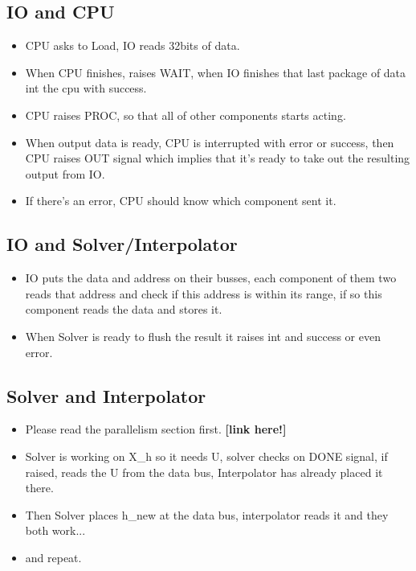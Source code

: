\documentclass[12pt]{report}
\begin{document}
\subsection{IO and CPU}
\begin{itemize}
    \item CPU asks to Load, IO reads 32bits of data.
    \item When CPU finishes, raises WAIT, when IO finishes that last package of data int the cpu with success.
    \item CPU raises PROC, so that all of other components starts acting.
    \item When output data is ready, CPU is interrupted with error or success, then CPU raises OUT signal which implies that it's ready to take out the resulting output from IO.
    \item If there's an error, CPU should know which component sent it.
\end{itemize}

\subsection{IO and Solver/Interpolator}
\begin{itemize}
    \item IO puts the data and address on their busses, each component of them two reads that address and check if this address is within its range, if so this component reads the data and stores it.
    \item When Solver is ready to flush the result it raises int and success or even error.
\end{itemize}

\subsection{Solver and Interpolator}
\begin{itemize}
    \item Please read the parallelism section first. \textbf{[link here!]}
    \item Solver is working on X\_h so it needs U, solver checks on DONE signal, if raised, reads the U from the data bus, Interpolator has already placed it there.
    \item Then Solver places h\_new at the data bus, interpolator reads it and they both work...
    \item and repeat.
\end{itemize}
\end{document}
